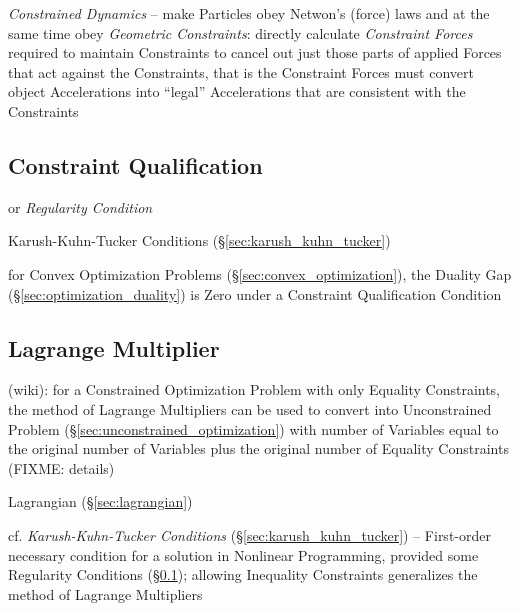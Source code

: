 \emph{Constrained Dynamics} -- make Particles obey Netwon's (force) laws and
at the same time obey \emph{Geometric Constraints}: directly calculate
\emph{Constraint Forces} required to maintain Constraints to cancel out just
those parts of applied Forces that act against the Constraints, that is the
Constraint Forces must convert object Accelerations into ``legal'' Accelerations
that are consistent with the Constraints



\subsection{Constraint Qualification}\label{sec:constraint_qualification}

or \emph{Regularity Condition}

\fist Karush-Kuhn-Tucker Conditions (\S\ref{sec:karush_kuhn_tucker})

for Convex Optimization Problems (\S\ref{sec:convex_optimization}), the Duality
Gap (\S\ref{sec:optimization_duality}) is Zero under a Constraint Qualification
Condition



\subsection{Lagrange Multiplier}\label{sec:lagrange_multiplier}

(wiki): for a Constrained Optimization Problem with only Equality Constraints,
the method of Lagrange Multipliers can be used to convert into Unconstrained
Problem (\S\ref{sec:unconstrained_optimization}) with number of Variables equal
to the original number of Variables plus the original number of Equality
Constraints (FIXME: details)

\fist Lagrangian (\S\ref{sec:lagrangian})

\fist cf. \emph{Karush-Kuhn-Tucker Conditions} (\S\ref{sec:karush_kuhn_tucker})
-- First-order necessary condition for a solution in Nonlinear Programming,
provided some Regularity Conditions (\S\ref{sec:constraint_qualification});
allowing Inequality Constraints generalizes the method of Lagrange Multipliers

